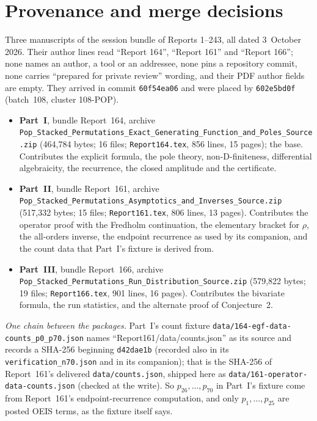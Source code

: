 \documentclass[11pt,letterpaper]{article}
\numberwithin{equation}{section}
\theoremstyle{remark}\newtheorem{remark}[theorem]{Remark}
\newcommand{\file}[1]{\nolinkurl{#1}}
\begin{document}
\section*{Provenance and merge decisions}\label{psp:sec:provenance}
Three manuscripts of the session bundle of Reports 1--243, all dated 3~October 2026. Their author lines read ``Report 164'', ``Report 161'' and ``Report 166''; none names an author, a tool or an addressee, none pins a repository commit, none carries ``prepared for private review'' wording, and their PDF author fields are empty. They arrived in commit \texttt{60f54ea06} and were placed by \texttt{602e5bd0f} (batch~108, cluster 108-POP).
\begin{itemize}
\item \textbf{Part~I}, bundle Report~164, archive \file{Pop_Stacked_Permutations_Exact_Generating_Function_and_Poles_Source.zip} (464,784 bytes; 16 files; \file{Report164.tex}, 856 lines, 15 pages); the base. Contributes the explicit formula, the pole theory, non-D-finiteness, differential algebraicity, the recurrence, the closed amplitude and the certificate.
\item \textbf{Part~II}, bundle Report~161, archive \file{Pop_Stacked_Permutations_Asymptotics_and_Inverses_Source.zip} (517,332 bytes; 15 files; \file{Report161.tex}, 806 lines, 13 pages). Contributes the operator proof with the Fredholm continuation, the elementary bracket for $\rho$, the all-orders inverse, the endpoint recurrence as used by its companion, and the count data that Part~I's fixture is derived from.
\item \textbf{Part~III}, bundle Report~166, archive \file{Pop_Stacked_Permutations_Run_Distribution_Source.zip} (579,822 bytes; 19 files; \file{Report166.tex}, 901 lines, 16 pages). Contributes the bivariate formula, the run statistics, and the alternate proof of Conjecture~2.
\end{itemize}
\emph{One chain between the packages.} Part~I's count fixture \file{data/164-egf-data-counts_p0_p70.json} names ``Report161/data/counts.json'' as its source and records a SHA-256 beginning \texttt{d42dae1b} (recorded also in its \file{verification_n70.json} and in its companion); that is the SHA-256 of Report~161's delivered \file{data/counts.json}, shipped here as \file{data/161-operator-data-counts.json} (checked at the write). So $p_{26},\dots,p_{70}$ in Part~I's fixture come from Report~161's endpoint-recurrence computation, and only $p_1,\dots,p_{25}$ are posted OEIS terms, as the fixture itself says.
\end{document}
